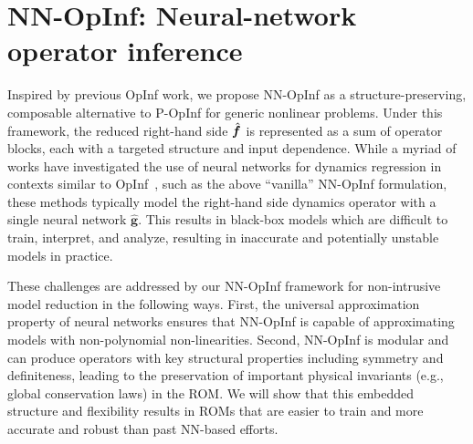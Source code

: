 \documentclass[3p,computermodern,11pt]{elsarticle}
\numberwithin{equation}{section}
\newcommand{\reducedVelocityNN}{\hat{\boldsymbol g}}
\newcommand{\reducedVelocity}{\skew{4}\hat{\velocity}}
\newcommand{\velocity}{\boldsymbol f}
\begin{document}

\section{NN-OpInf: Neural-network operator inference}\label{sec:nnopinf}
Inspired by previous OpInf work, we propose NN-OpInf as a structure-preserving, composable alternative to P-OpInf for generic nonlinear problems.  Under this framework, the reduced right-hand side $\reducedVelocity$ is represented as a sum of operator blocks, each with a targeted structure and input dependence. While a myriad of works have investigated the use of neural networks for dynamics regression in contexts similar to OpInf~\cite{GaWaZh20,SaMaAh19}, such as the above ``vanilla'' NN-OpInf formulation, these methods typically model the right-hand side dynamics operator with a single neural network $\reducedVelocityNN$. This results in black-box models which are difficult to train, interpret, and analyze, resulting in inaccurate and potentially unstable models in practice.  

These challenges are addressed by our NN-OpInf framework for non-intrusive model reduction in the following ways. First, the universal approximation property of neural networks ensures that NN-OpInf is capable of approximating models with non-polynomial non-linearities. Second, NN-OpInf is modular and can produce operators with key structural properties including symmetry and definiteness, leading to the preservation of important physical invariants (e.g., global conservation laws) in the ROM.  We will show that this embedded structure and flexibility results in ROMs that are easier to train and  more accurate and robust than past NN-based efforts. 
\end{document}
